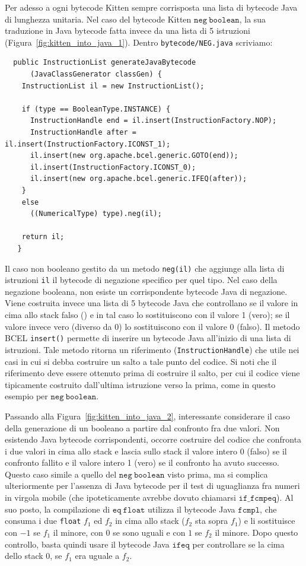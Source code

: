 Per adesso a ogni bytecode Kitten \e sempre corrisposta una lista di bytecode Java di lunghezza unitaria.
Nel caso del bytecode Kitten $\mathtt{neg\ boolean}$, la sua traduzione in Java bytecode
\e fatta invece da una lista di 5 istruzioni (Figura~\ref{fig:kitten_into_java_1}). Dentro
\texttt{bytecode/NEG.java} scriviamo:
%
\begin{verbatim}
  public InstructionList generateJavaBytecode
      (JavaClassGenerator classGen) {
    InstructionList il = new InstructionList();

    if (type == BooleanType.INSTANCE) {
      InstructionHandle end = il.insert(InstructionFactory.NOP);
      InstructionHandle after = il.insert(InstructionFactory.ICONST_1);
      il.insert(new org.apache.bcel.generic.GOTO(end));
      il.insert(InstructionFactory.ICONST_0);
      il.insert(new org.apache.bcel.generic.IFEQ(after));
    }
    else
      ((NumericalType) type).neg(il);
    
    return il;
   }
\end{verbatim}
%
Il caso non booleano \e gestito da un metodo \texttt{neg(il)} che aggiunge alla
lista di istruzioni \texttt{il} il bytecode di negazione specifico per quel tipo.
Nel caso della negazione booleana, non esiste un corrispondente bytecode Java di negazione.
Viene costruita invece una lista di 5 bytecode Java che
controllano se il valore in cima allo stack \e falso () e in tal caso
lo sostituiscono con il valore 1 (\cioe vero); se il valore \e invece vero (diverso da 0)
lo sostituiscono con il valore 0 (\cioe falso). Il metodo BCEL \texttt{insert()}
permette di inserire un bytecode Java all'inizio di una lista di istruzioni.
Tale metodo ritorna un riferimento (\texttt{InstructionHandle}) che \e utile nei casi
in cui si debba costruire un salto a tale punto del codice. Si noti che il riferimento deve
essere ottenuto prima di costruire il salto, per cui il codice viene tipicamente
costruito dall'ultima istruzione verso la prima, come in questo esempio
per $\mathtt{neg\ boolean}$.

Passando alla Figura~\ref{fig:kitten_into_java_2}, \e interessante considerare il caso
della generazione di un booleano a partire dal confronto fra due valori. Non esistendo
Java bytecode corrispondenti, occorre costruire del codice che confronta i due valori
in cima allo stack e lascia sullo stack il valore intero 0 (\cioe falso) se il
confronto \e fallito e il valore intero 1 (\cioe vero) se il confronto ha avuto successo.
Questo caso \e simile a quello del $\mathtt{neg\ boolean}$ visto prima, ma si complica
ulteriormente per l'assenza di Java bytecode per il test di uguaglianza fra
numeri in virgola mobile (che ipoteticamente avrebbe dovuto chiamarsi $\mathtt{if\_fcmpeq}$).
Al suo posto, la compilazione di $\mathtt{eq\ float}$ utilizza il bytecode Java
$\mathtt{fcmpl}$, che consuma i due \texttt{float} $f_1$ ed $f_2$ in cima allo stack
($f_2$ sta sopra $f_1$) e li sostituisce con $-1$ se $f_1$ \e il minore,
con $0$ se sono uguali e con $1$ se $f_2$ \e il minore. Dopo questo controllo,
basta quindi usare il bytecode Java $\mathtt{ifeq}$ per controllare se la cima dello
stack \e $0$, \cioe se $f_1$ era uguale a $f_2$.

